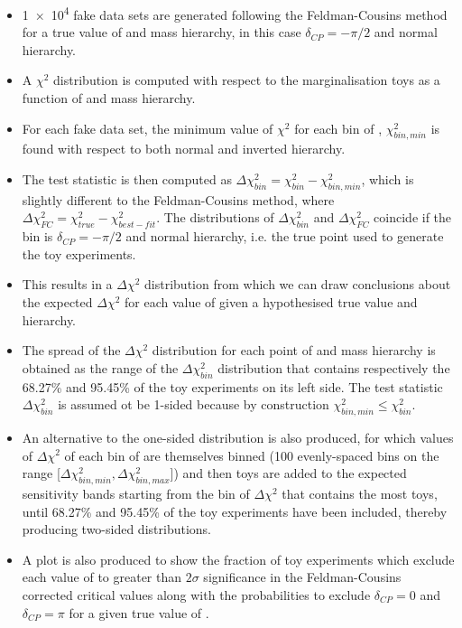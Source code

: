 \begin{itemize}
	\item \num{1e4} fake data sets are generated following the Feldman-Cousins method for a true value of \deltacp and mass hierarchy, in this case $\delta_{CP} = -\pi/2$ and normal hierarchy.
	\item A $\chi^2$ distribution is computed with respect to the marginalisation toys as a function of \deltacp and mass hierarchy.
	\item For each fake data set, the minimum value of $\chi^2$ for each bin of \deltacp, $\chi^2_{bin,min}$ is found with respect to both normal and inverted hierarchy.
	\item The test statistic is then computed as $\Delta\chi^2_{bin} = \chi^2_{bin} - \chi^2_{bin,min}$, which is slightly different to the Feldman-Cousins method, where $\Delta\chi^2_{FC} = \chi^2_{true} - \chi^2_{best-fit}$. The distributions of $\Delta\chi^2_{bin}$ and $\Delta\chi^2_{FC}$ coincide if the bin is $\delta_{CP} = -\pi/2$ and normal hierarchy, i.e. the true point used to generate the toy experiments.
	\item This results in a $\Delta\chi^2$ distribution from which we can draw conclusions about the expected $\Delta\chi^2$ for each value of \deltacp given a hypothesised true value and hierarchy.
	\item The spread of the $\Delta\chi^2$ distribution for each point of \deltacp and mass hierarchy is obtained as the range of the $\Delta\chi^2_{bin}$ distribution that contains respectively the 68.27\% and 95.45\% of the toy experiments on its left side. The test statistic $\Delta\chi^2_{bin}$ is assumed ot be 1-sided because by construction $\chi^2_{bin,min} \le \chi^2_{bin}$.
	\item An alternative to the one-sided distribution is also produced, for which values of $\Delta\chi^2$ of each bin of \deltacp are themselves binned (100 evenly-spaced bins on the range [$\Delta\chi^2_{bin,min},\Delta\chi^2_{bin,max}$]) and then toys are added to the expected sensitivity bands starting from the bin of $\Delta\chi^2$ that contains the most toys, until 68.27\% and 95.45\% of the toy experiments have been included, thereby producing two-sided distributions.
	\item A plot is also produced to show the fraction of toy experiments which exclude each value of \deltacp to greater than $2\sigma$ significance in the Feldman-Cousins corrected critical values along with the probabilities to exclude $\delta_{CP} = 0$ and $\delta_{CP} = \pi$ for a given true value of \deltacp.
\end{itemize}


